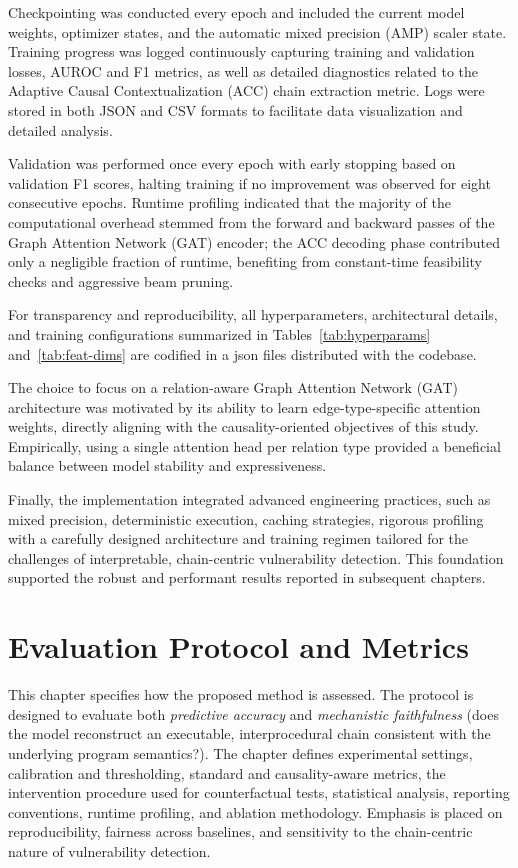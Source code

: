 \documentclass{buthesis}
\begin{document}
Checkpointing was conducted every epoch and included the current model weights, optimizer states, and the automatic mixed precision (AMP) scaler state. Training progress was logged continuously capturing training and validation losses, AUROC and F1 metrics, as well as detailed diagnostics related to the Adaptive Causal Contextualization (ACC) chain extraction metric. Logs were stored in both JSON and CSV formats to facilitate data visualization and detailed analysis.

Validation was performed once every epoch with early stopping based on validation F1 scores, halting training if no improvement was observed for eight consecutive epochs. Runtime profiling indicated that the majority of the computational overhead stemmed from the forward and backward passes of the Graph Attention Network (GAT) encoder; the ACC decoding phase contributed only a negligible fraction of runtime, benefiting from constant-time feasibility checks and aggressive beam pruning.

For transparency and reproducibility, all hyperparameters, architectural details, and training configurations summarized in Tables~\ref{tab:hyperparams} and~\ref{tab:feat-dims} are codified in a json files distributed with the codebase.

The choice to focus on a relation-aware Graph Attention Network (GAT) architecture was motivated by its ability to learn edge-type-specific attention weights, directly aligning with the causality-oriented objectives of this study. Empirically, using a single attention head per relation type provided a beneficial balance between model stability and expressiveness.

Finally, the implementation integrated advanced engineering practices, such as mixed precision, deterministic execution, caching strategies, rigorous profiling with a carefully designed architecture and training regimen tailored for the challenges of interpretable, chain-centric vulnerability detection. This foundation supported the robust and performant results reported in subsequent chapters.


\chapter{Evaluation Protocol and Metrics}
\label{chap:evaluation}

This chapter specifies how the proposed method is assessed. The protocol is designed to evaluate both \emph{predictive accuracy} and \emph{mechanistic faithfulness} (does the model reconstruct an executable, interprocedural chain consistent with the underlying program semantics?). The chapter defines experimental settings, calibration and thresholding, standard and causality-aware metrics, the intervention procedure used for counterfactual tests, statistical analysis, reporting conventions, runtime profiling, and ablation methodology. Emphasis is placed on reproducibility, fairness across baselines, and sensitivity to the chain-centric nature of vulnerability detection.
\end{document}
